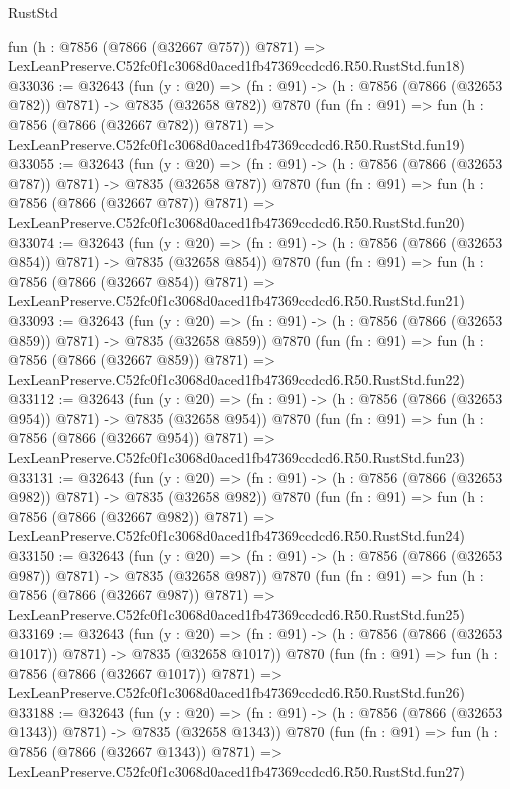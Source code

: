 \begin{lexlean}{RustStd}
\begin{coremodule}
    fun (h : @7856 (@7866 (@32667 @757)) @7871) =>
    LexLeanPreserve.C52fc0f1c3068d0aced1fb47369ccdcd6.R50.RustStd.fun18)
@33036 := @32643
    (fun (y : @20) => (fn : @91) -> (h : @7856 (@7866 (@32653 @782)) @7871) -> @7835 (@32658 @782))
    @7870
    (fun (fn : @91) =>
    fun (h : @7856 (@7866 (@32667 @782)) @7871) =>
    LexLeanPreserve.C52fc0f1c3068d0aced1fb47369ccdcd6.R50.RustStd.fun19)
@33055 := @32643
    (fun (y : @20) => (fn : @91) -> (h : @7856 (@7866 (@32653 @787)) @7871) -> @7835 (@32658 @787))
    @7870
    (fun (fn : @91) =>
    fun (h : @7856 (@7866 (@32667 @787)) @7871) =>
    LexLeanPreserve.C52fc0f1c3068d0aced1fb47369ccdcd6.R50.RustStd.fun20)
@33074 := @32643
    (fun (y : @20) => (fn : @91) -> (h : @7856 (@7866 (@32653 @854)) @7871) -> @7835 (@32658 @854))
    @7870
    (fun (fn : @91) =>
    fun (h : @7856 (@7866 (@32667 @854)) @7871) =>
    LexLeanPreserve.C52fc0f1c3068d0aced1fb47369ccdcd6.R50.RustStd.fun21)
@33093 := @32643
    (fun (y : @20) => (fn : @91) -> (h : @7856 (@7866 (@32653 @859)) @7871) -> @7835 (@32658 @859))
    @7870
    (fun (fn : @91) =>
    fun (h : @7856 (@7866 (@32667 @859)) @7871) =>
    LexLeanPreserve.C52fc0f1c3068d0aced1fb47369ccdcd6.R50.RustStd.fun22)
@33112 := @32643
    (fun (y : @20) => (fn : @91) -> (h : @7856 (@7866 (@32653 @954)) @7871) -> @7835 (@32658 @954))
    @7870
    (fun (fn : @91) =>
    fun (h : @7856 (@7866 (@32667 @954)) @7871) =>
    LexLeanPreserve.C52fc0f1c3068d0aced1fb47369ccdcd6.R50.RustStd.fun23)
@33131 := @32643
    (fun (y : @20) => (fn : @91) -> (h : @7856 (@7866 (@32653 @982)) @7871) -> @7835 (@32658 @982))
    @7870
    (fun (fn : @91) =>
    fun (h : @7856 (@7866 (@32667 @982)) @7871) =>
    LexLeanPreserve.C52fc0f1c3068d0aced1fb47369ccdcd6.R50.RustStd.fun24)
@33150 := @32643
    (fun (y : @20) => (fn : @91) -> (h : @7856 (@7866 (@32653 @987)) @7871) -> @7835 (@32658 @987))
    @7870
    (fun (fn : @91) =>
    fun (h : @7856 (@7866 (@32667 @987)) @7871) =>
    LexLeanPreserve.C52fc0f1c3068d0aced1fb47369ccdcd6.R50.RustStd.fun25)
@33169 := @32643
    (fun (y : @20) =>
    (fn : @91) -> (h : @7856 (@7866 (@32653 @1017)) @7871) -> @7835 (@32658 @1017))
    @7870
    (fun (fn : @91) =>
    fun (h : @7856 (@7866 (@32667 @1017)) @7871) =>
    LexLeanPreserve.C52fc0f1c3068d0aced1fb47369ccdcd6.R50.RustStd.fun26)
@33188 := @32643
    (fun (y : @20) =>
    (fn : @91) -> (h : @7856 (@7866 (@32653 @1343)) @7871) -> @7835 (@32658 @1343))
    @7870
    (fun (fn : @91) =>
    fun (h : @7856 (@7866 (@32667 @1343)) @7871) =>
    LexLeanPreserve.C52fc0f1c3068d0aced1fb47369ccdcd6.R50.RustStd.fun27)

\end{coremodule}
\end{lexlean}
